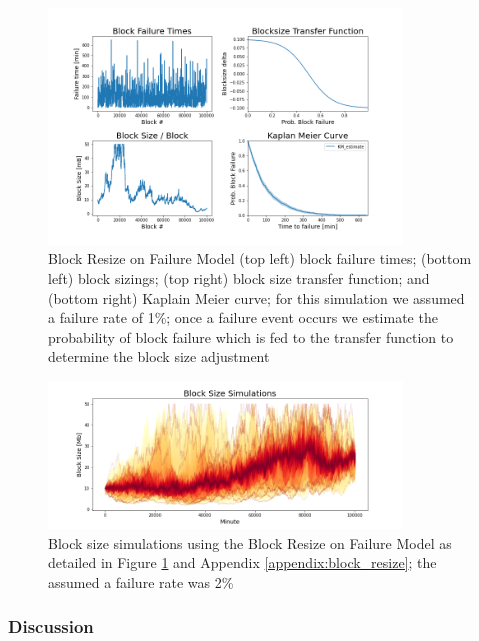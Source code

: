 \documentclass[peerreview]{ieeesyscoin}
\begin{document}
\begin{figure}[h!]
\includegraphics[width=3.7in]{img/block_failure.png}
\caption{Block Resize on Failure Model (top left) block failure times; (bottom left) block sizings; (top right) block size transfer function; and (bottom right) Kaplain Meier curve; for this simulation we assumed a failure rate of 1\%; once a failure event occurs we estimate the probability of block failure which is fed to the transfer function to determine the block size adjustment} 
\label{fig:block_failure}
\end{figure} 

\begin{figure}[h!]
\includegraphics[width=3.7in]{img/blk_size_simulations.png}
\caption{Block size simulations using the Block Resize on Failure Model as detailed in Figure \ref{fig:block_failure} and Appendix \ref{appendix:block_resize}; the assumed a failure rate was 2\%} 
\label{fig:blk_size_simulations}
\end{figure} 

\subsubsection{Discussion}
\end{document}
